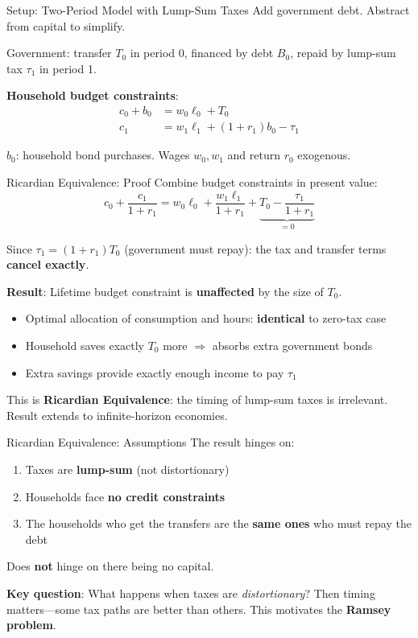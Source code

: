 \documentclass[blue]{beamer}
\begin{document}
\begin{frame}{Setup: Two-Period Model with Lump-Sum Taxes}
	Add government debt. Abstract from capital to simplify.
	
	\bigskip
	Government: transfer $T_0$ in period 0, financed by debt $B_0$, repaid by lump-sum tax $\tau_1$ in period 1.
	
	\bigskip
	\textbf{Household budget constraints}:
	\begin{align*}
		c_0 + b_0 &= w_0 \ell_0 + T_0 \\
		c_1 &= w_1 \ell_1 + (1+r_1) b_0 - \tau_1
	\end{align*}
	
	$b_0$: household bond purchases. Wages $w_0, w_1$ and return $r_0$ exogenous.
\end{frame}

\begin{frame}{Ricardian Equivalence: Proof}
	Combine budget constraints in present value:
	\[
	c_0 + \frac{c_1}{1+r_1} = w_0 \ell_0 + \frac{w_1 \ell_1}{1+r_1} + \underbrace{T_0 - \frac{\tau_1}{1+r_1}}_{= 0}
	\]
		\vspace{-10pt}
		
	Since $\tau_1 = (1+r_1) T_0$ (government must repay): the tax and transfer terms \textbf{cancel exactly}.
	
	\textbf{Result}: Lifetime budget constraint is \textbf{unaffected} by the size of $T_0$.
	\vspace{-20pt}
	\begin{itemize}
		\item Optimal allocation of consumption and hours: \textbf{identical} to zero-tax case
		\item Household saves exactly $T_0$ more $\Rightarrow$ absorbs extra government bonds
		\item Extra savings provide exactly enough income to pay $\tau_1$
	\end{itemize}
	This is \textbf{Ricardian Equivalence}: the timing of lump-sum taxes is irrelevant. Result extends to infinite-horizon economies.
\end{frame}

\begin{frame}{Ricardian Equivalence: Assumptions}
	The result hinges on:
	\begin{enumerate}
		\item Taxes are \textbf{lump-sum} (not distortionary)
		\item Households face \textbf{no credit constraints}
		\item The households who get the transfers are the \textbf{same ones} who must repay the debt
	\end{enumerate}
	
	\bigskip
	Does \textbf{not} hinge on there being no capital.
	
	\bigskip
	\textbf{Key question}: What happens when taxes are \emph{distortionary}? Then timing matters---some tax paths are better than others. This motivates the \textbf{Ramsey problem}.
\end{frame}
\end{document}
